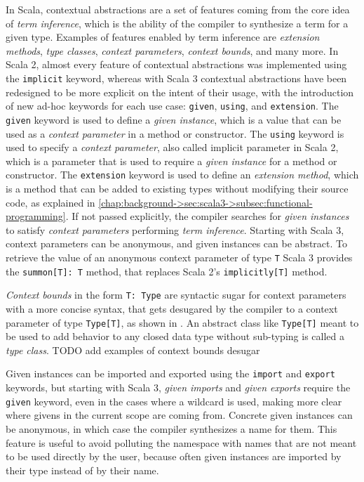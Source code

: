 In Scala, contextual abstractions are a set of features coming from the core idea of \textit{term inference}, which is the ability of the compiler to synthesize a  term for a given type.
%
Examples of features enabled by term inference are \textit{extension methods}, \textit{type classes}, \textit{context parameters}, \textit{context bounds}, and many more.
%
In Scala 2, almost every feature of contextual abstractions was implemented using the \texttt{implicit} keyword, whereas with Scala 3 contextual abstractions have been redesigned to be more explicit on the intent of their usage, with the introduction of new ad-hoc keywords for each use case: \texttt{given}, \texttt{using}, and \texttt{extension}.
%
The \texttt{given} keyword is used to define a \textit{given instance}, which is a value that can be used as a \textit{context parameter} in a method or constructor.
%
The \texttt{using} keyword is used to specify a \textit{context parameter}, also called implicit parameter in Scala 2, which is a parameter that is used to require a \textit{given instance} for a method or constructor.
%
The \texttt{extension} keyword is used to define an \textit{extension method}, which is a method that can be added to existing types without modifying their source code, as explained in \cref{chap:background->sec:scala3->subsec:functional-programming}.
%
If not passed explicitly, the compiler searches for \textit{given instances} to satisfy \textit{context parameters} performing \textit{term inference}.
%
Starting with Scala 3, context parameters can be anonymous, and given instances can be abstract.
%
To retrieve the value of an anonymous context parameter of type \texttt{T} Scala 3 provides the \texttt{summon[T]: T} method, that replaces Scala 2's \texttt{implicitly[T]} method.

\textit{Context bounds} in the form \texttt{T: Type} are syntactic sugar for context parameters with a more concise syntax, that gets desugared by the compiler to a context parameter of type \texttt{Type[T]}, as shown in .
%
An abstract class like \texttt{Type[T]} meant to be used to add behavior to any closed data type without sub-typing is called a \textit{type class}.
TODO add examples of context bounds desugar

Given instances can be imported and exported using the \texttt{import} and \texttt{export} keywords, but starting with Scala 3, \textit{given imports} and \textit{given exports} require the \texttt{given} keyword, even in the cases where a wildcard is used, making more clear where givens in the current scope are coming from.
%
Concrete given instances can be anonymous, in which case the compiler synthesizes a name for them.
%
This feature is useful to avoid polluting the namespace with names that are not meant to be used directly by the user, because often given instances are imported by their type instead of by their name.

